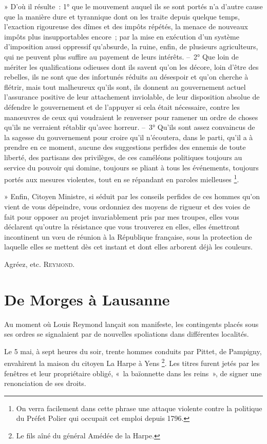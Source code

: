 \documentclass[french,twoside]{book} %
\newenvironment{quoteblock}%
  {\begin{quoting}}
  {\end{quoting}}
\newenvironment{quotebar}{%
    \def\FrameCommand{{\color{rubric!10!}\vrule width 0.5em} \hspace{0.9em}}%
    \def\OuterFrameSep{\itemsep} %
    \MakeFramed {\advance\hsize-\width \FrameRestore}
  }%
  {%
    \endMakeFramed
  }
\renewenvironment{quoteblock}%
  {%
    \savenotes
    \setstretch{0.9}
    \normalfont
    \begin{quotebar}
  }
  {%
    \end{quotebar}
    \spewnotes
  }
\begin{document}
\begin{quoteblock}
 » D’où il résulte : 1° que le mouvement auquel ils se sont portés n’a d’autre cause que la manière dure et tyrannique dont on les traite depuis quelque temps, l’exaction rigoureuse des dîmes et des impôts répétés, la menace de nouveaux impôts plus insupportables encore ; par la mise en exécution d’un système d’imposition aussi oppressif qu’absurde, la ruine, enfin, de plusieurs agriculteurs, qui ne peuvent plus suffire au payement de leurs intérêts. – 2° Que loin de mériter les qualifications odieuses dont ils savent qu’on les décore, loin d’être des rebelles, ils ne sont que des infortunés réduits au désespoir et qu’on cherche à flétrir, mais tout malheureux qu’ils sont, ils donnent au gouvernement actuel l’assurance positive de leur attachement inviolable, de leur disposition absolue de défendre le gouvernement et de l’appuyer si cela était nécessaire, contre les manœuvres de ceux qui voudraient le renverser pour ramener un ordre de choses qu’ils ne verraient rétablir qu’avec horreur. – 3° Qu’ils sont assez convaincus de la sagesse du gouvernement pour croire qu’il n’écoutera, dans le parti, qu’il a à prendre en ce moment, aucune des suggestions perfides des ennemis de toute liberté, des partisans des privilèges, de ces caméléons politiques toujours au service du pouvoir qui domine, toujours se pliant à tous les événements, toujours portés aux mesures violentes, tout en se répandant en paroles mielleuses \footnote{On verra facilement dans cette phrase une attaque violente contre la politique du Préfet Polier qui occupait cet emploi depuis 1796.}.\par
 » Enfin, Citoyen Ministre, si séduit par les conseils perfides de ces hommes qu’on vient de vous dépeindre, vous ordonniez des moyens de rigueur et des voies de fait pour opposer au projet invariablement pris par mes troupes, elles vous déclarent qu’outre la résistance que vous trouverez en elles, elles émettront incontinent un vœu de réunion à la République française, sous la protection de laquelle elles se mettent dès cet instant et dont elles arborent déjà les couleurs.\par
 Agréez, etc. {\scshape Reymond.}
 \end{quoteblock}

\section[{De Morges à Lausanne}]{De Morges à Lausanne}
\noindent Au moment où Louis Reymond lançait son manifeste, les contingents placés sous ses ordres se signalaient par de nouvelles spoliations dans différentes localités.\par
Le 5 mai, à sept heures du soir, trente hommes conduits par Pittet, de Pampigny, envahirent la maison du citoyen La Harpe à Yens \footnote{Le fils aîné du général Amédée de la Harpe.}. Les titres furent jetés par les fenêtres et leur propriétaire obligé, « la baïonnette dans les reins », de signer une renonciation de ses droits.\par
\end{document}
